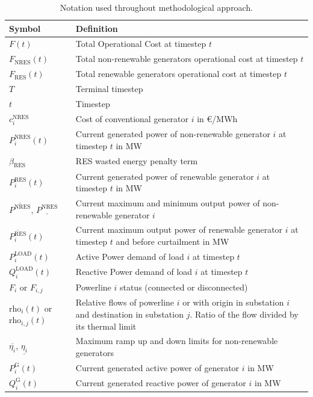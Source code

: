 \begin{table}
	\caption{Notation used throughout methodological approach.}
	\begin{tabular}{lp{9.5cm}} 
		\toprule
		\textbf{Symbol} & \textbf{Definition} \\
		\midrule
		$F(t)$ & Total Operational Cost at timestep $t$ \\ 
		$F_\text{NRES}(t)$ & Total non-renewable generators operational cost at timestep $t$ \\
		$F_\text{RES}(t)$ & Total renewable generators operational cost at timestep $t$  \\
		$T$ & Terminal timestep \\
		$t$ & Timestep \\
		$c^\text{NRES}_i$ & Cost of conventional generator $i$ in €/MWh \\
		$P^\text{NRES}_i(t)$ & Current generated power of non-renewable generator $i$ at timestep $t$ in MW \\
		$\beta_\text{RES}$ & \ac{RES} wasted energy penalty term \\
		$P^\text{RES}_i(t)$ & Current generated power of renewable generator $i$ at timestep $t$ in MW \\
		$\overline{P^\text{NRES}}$, $\underline{P^\text{NRES}}$ &  Current maximum and minimum output power of non-renewable generator $i$ \\
		$\overline{P^\text{RES}_i}(t)$ &  Current maximum output power of renewable generator $i$ at timestep $t$ and before curtailment in MW \\
		$P^\text{LOAD}_i(t)$ & Active Power demand of load $i$ at timestep $t$ \\
		$Q^\text{LOAD}_i(t)$ & Reactive Power demand of load $i$ at timestep $t$ \\
		$F_i$ or $F_{i,j}$ & Powerline $i$ status (connected or disconnected) \\
		$\text{rho}_i(t)$ or $\text{rho}_{i,j}(t)$ & Relative flows of powerline $i$ or with origin in substation $i$ and destination in substation $j$. Ratio of the flow divided by its thermal limit \\
		$\overline{\eta_i}$, $\underline{\eta_i}$ & Maximum ramp up and down limits for non-renewable generators \\
		$P^\text{G}_i(t)$ & Current generated active power of generator $i$ in MW \\
		$Q^\text{G}_i(t)$ & Current generated reactive power of generator $i$ in MW \\

\end{tabular}
\end{table}
